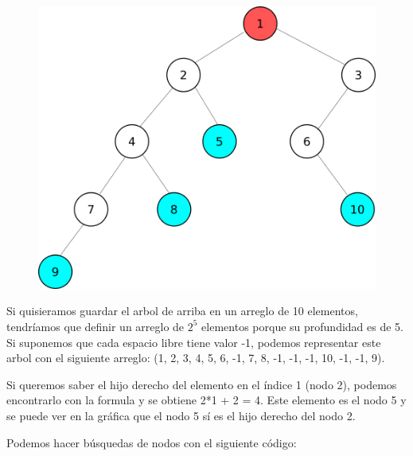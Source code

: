 \documentclass{article}
\begin{document}
\begin{figure}[H]
    \centering
    \includegraphics[width=0.3\paperwidth]{arbolbinario}
\end{figure}

Si quisieramos guardar el arbol de arriba en un arreglo de 10 elementos, tendríamos que definir un arreglo de $2^5$ elementos porque su profundidad es de 5. Si suponemos que cada espacio libre tiene valor -1, podemos representar este arbol con el siguiente arreglo: (1, 2, 3, 4, 5, 6, -1, 7, 8, -1, -1, -1, 10, -1, -1, 9).

Si queremos saber el hijo derecho del elemento en el índice 1 (nodo 2), podemos encontrarlo con la formula y se obtiene 2*1 + 2 = 4. Este elemento es el nodo 5 y se puede ver en la gráfica que el nodo 5 sí es el hijo derecho del nodo 2.

Podemos hacer búsquedas de nodos con el siguiente código:
\end{document}
